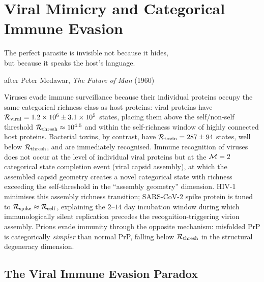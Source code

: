 
\chapter{Viral Mimicry and Categorical Immune Evasion}
\label{chap:viral_mimicry}

\epigraph{%
  The perfect parasite is invisible not because it hides,\\
  but because it speaks the host's language.%
}{after Peter Medawar, \textit{The Future of Man} (1960)}

\begin{chapterbox}
Viruses evade immune surveillance because their individual proteins occupy the
same categorical richness class as host proteins: viral proteins have
$\mathcal{R}_{\mathrm{viral}} = 1.2 \times 10^6 \pm 3.1 \times 10^5$ states, placing
them above the self/non-self threshold $\mathcal{R}_{\mathrm{thresh}} \approx 10^{4.5}$
and within the self-richness window of highly connected host proteins. Bacterial
toxins, by contrast, have $\mathcal{R}_{\mathrm{toxin}} = 287 \pm 94$ states,
well below $\mathcal{R}_{\mathrm{thresh}}$, and are immediately recognised.
Immune recognition of viruses does not occur at the level of individual viral
proteins but at the $\mathcal{M} = 2$ categorical state completion event (viral
capsid assembly), at which the assembled capsid geometry creates a novel
categorical state with richness exceeding the self-threshold in the
``assembly geometry'' dimension. HIV-1 minimises this assembly richness
transition; SARS-CoV-2 spike protein is tuned to $\mathcal{R}_{\mathrm{spike}} \approx \mathcal{R}_{\mathrm{self}}$,
explaining the $2$--$14$ day incubation window during which immunologically
silent replication precedes the recognition-triggering virion assembly.
Prions evade immunity through the opposite mechanism: misfolded PrP is
categorically \emph{simpler} than normal PrP, falling below
$\mathcal{R}_{\mathrm{thresh}}$ in the structural degeneracy dimension.
\end{chapterbox}

\section{The Viral Immune Evasion Paradox}
\label{sec:viral_paradox}

